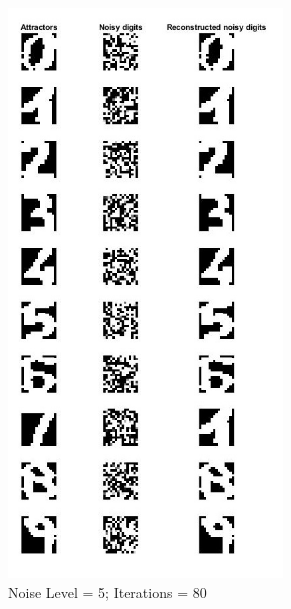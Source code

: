 \begin{figure}[ht]
\begin{subfigure}[b]{0.26\textwidth}
		\includegraphics[height = 1.2\textwidth, width = 0.8\textwidth]{Exercise2/Report/hdr_n5_itr80.jpg}
		\caption{Noise Level = 5; Iterations = 80}\label{fig:hop_digit2}
	\end{subfigure}%
	\begin{subfigure}[b]{0.26\textwidth}
		\centering
		\captionsetup{width=0.8\linewidth, format = hang}

\end{subfigure}
\end{figure}
